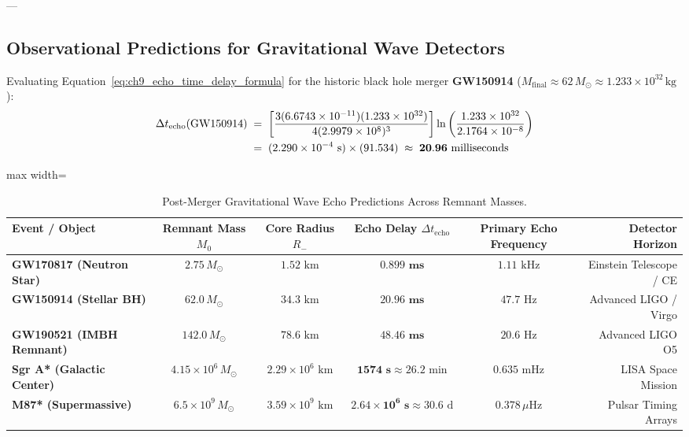 \documentclass[
    12pt,
    a4paper,
    headings=normal,
    twoside=false,
    open=any,
    parskip=half
]{scrbook}
\begin{document}
---

\subsection{Observational Predictions for Gravitational Wave Detectors}

Evaluating Equation~\eqref{eq:ch9_echo_time_delay_formula} for the historic black hole merger \textbf{GW150914} ($M_{\text{final}} \approx 62 \, M_\odot \approx 1.233 \times 10^{32}\,\text{kg}$):
\begin{align}
\Delta t_{\text{echo}}(\text{GW150914}) &\;=\; \left[ \frac{3(6.6743 \times 10^{-11})(1.233 \times 10^{32})}{4(2.9979 \times 10^8)^3} \right] \ln\left( \frac{1.233 \times 10^{32}}{2.1764 \times 10^{-8}} \right) \notag \\
&\;=\; (2.290 \times 10^{-4} \text{ s}) \times (91.534) \;\approx\; \mathbf{20.96 \text{ milliseconds}}
\label{eq:ch9_gw150914_echo_val}
\end{align}

\begin{table}[htbp]
\centering
\small
\caption{Post-Merger Gravitational Wave Echo Predictions Across Remnant Masses.}
\label{tab:ch9_gravitational_wave_echoes_scorecard}
\begin{adjustbox}{max width=\textwidth}
\begin{tabular}{lccccr}\toprule
\textbf{Event / Object} & \textbf{Remnant Mass $M_0$} & \textbf{Core Radius $R_-$} & \textbf{Echo Delay $\Delta t_{\text{echo}}$} & \textbf{Primary Echo Frequency} & \textbf{Detector Horizon} \\\midrule
\rowcolor{secondarycolor!8}
\textbf{GW170817 (Neutron Star)} & $2.75 \, M_\odot$ & $1.52\text{ km}$ & $\mathbf{0.899 \text{ ms}}$ & $1.11\text{ kHz}$ & Einstein Telescope / CE \\
\textbf{GW150914 (Stellar BH)} & $62.0 \, M_\odot$ & $34.3\text{ km}$ & $\mathbf{20.96 \text{ ms}}$ & $47.7\text{ Hz}$ & Advanced LIGO / Virgo \\
\rowcolor{secondarycolor!8}
\textbf{GW190521 (IMBH Remnant)} & $142.0 \, M_\odot$ & $78.6\text{ km}$ & $\mathbf{48.46 \text{ ms}}$ & $20.6\text{ Hz}$ & Advanced LIGO O5 \\
\textbf{Sgr A* (Galactic Center)} & $4.15 \times 10^6 \, M_\odot$ & $2.29 \times 10^6\text{ km}$ & $\mathbf{1574 \text{ s}} \approx 26.2\text{ min}$ & $0.635\text{ mHz}$ & LISA Space Mission \\
\rowcolor{secondarycolor!8}
\textbf{M87* (Supermassive)} & $6.5 \times 10^9 \, M_\odot$ & $3.59 \times 10^9\text{ km}$ & $\mathbf{2.64 \times 10^6 \text{ s}} \approx 30.6\text{ d}$ & $0.378\,\mu\text{Hz}$ & Pulsar Timing Arrays \\\bottomrule
\end{tabular}
\end{adjustbox}
\end{table}
\end{document}
